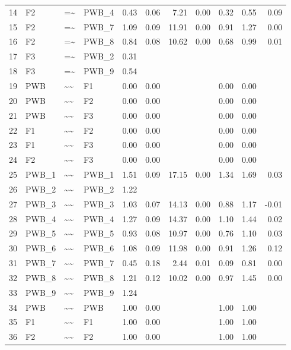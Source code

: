 \documentclass{article}
\begin{document}
\begin{table}[ht]
\begin{tabular}{rlllrrrrrrr}
  14 & F2 & =\~{} & PWB\_4 & 0.43 & 0.06 & 7.21 & 0.00 & 0.32 & 0.55 & 0.09 \\ 
  15 & F2 & =\~{} & PWB\_7 & 1.09 & 0.09 & 11.91 & 0.00 & 0.91 & 1.27 & 0.00 \\ 
  16 & F2 & =\~{} & PWB\_8 & 0.84 & 0.08 & 10.62 & 0.00 & 0.68 & 0.99 & 0.01 \\ 
  17 & F3 & =\~{} & PWB\_2 & 0.31 &  &  &  &  &  &  \\ 
  18 & F3 & =\~{} & PWB\_9 & 0.54 &  &  &  &  &  &  \\ 
  19 & PWB & \~{}\~{} & F1 & 0.00 & 0.00 &  &  & 0.00 & 0.00 &  \\ 
  20 & PWB & \~{}\~{} & F2 & 0.00 & 0.00 &  &  & 0.00 & 0.00 &  \\ 
  21 & PWB & \~{}\~{} & F3 & 0.00 & 0.00 &  &  & 0.00 & 0.00 &  \\ 
  22 & F1 & \~{}\~{} & F2 & 0.00 & 0.00 &  &  & 0.00 & 0.00 &  \\ 
  23 & F1 & \~{}\~{} & F3 & 0.00 & 0.00 &  &  & 0.00 & 0.00 &  \\ 
  24 & F2 & \~{}\~{} & F3 & 0.00 & 0.00 &  &  & 0.00 & 0.00 &  \\ 
  25 & PWB\_1 & \~{}\~{} & PWB\_1 & 1.51 & 0.09 & 17.15 & 0.00 & 1.34 & 1.69 & 0.03 \\ 
  26 & PWB\_2 & \~{}\~{} & PWB\_2 & 1.22 &  &  &  &  &  &  \\ 
  27 & PWB\_3 & \~{}\~{} & PWB\_3 & 1.03 & 0.07 & 14.13 & 0.00 & 0.88 & 1.17 & -0.01 \\ 
  28 & PWB\_4 & \~{}\~{} & PWB\_4 & 1.27 & 0.09 & 14.37 & 0.00 & 1.10 & 1.44 & 0.02 \\ 
  29 & PWB\_5 & \~{}\~{} & PWB\_5 & 0.93 & 0.08 & 10.97 & 0.00 & 0.76 & 1.10 & 0.03 \\ 
  30 & PWB\_6 & \~{}\~{} & PWB\_6 & 1.08 & 0.09 & 11.98 & 0.00 & 0.91 & 1.26 & 0.12 \\ 
  31 & PWB\_7 & \~{}\~{} & PWB\_7 & 0.45 & 0.18 & 2.44 & 0.01 & 0.09 & 0.81 & 0.00 \\ 
  32 & PWB\_8 & \~{}\~{} & PWB\_8 & 1.21 & 0.12 & 10.02 & 0.00 & 0.97 & 1.45 & 0.00 \\ 
  33 & PWB\_9 & \~{}\~{} & PWB\_9 & 1.24 &  &  &  &  &  &  \\ 
  34 & PWB & \~{}\~{} & PWB & 1.00 & 0.00 &  &  & 1.00 & 1.00 &  \\ 
  35 & F1 & \~{}\~{} & F1 & 1.00 & 0.00 &  &  & 1.00 & 1.00 &  \\ 
  36 & F2 & \~{}\~{} & F2 & 1.00 & 0.00 &  &  & 1.00 & 1.00 &  \\ 

\end{tabular}
\end{table}
\end{document}
